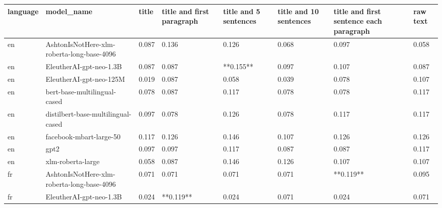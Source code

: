 \begin{tabular}{llllllll}
\toprule
language &                                 model\_name & title & title and first paragraph & title and 5 sentences & title and 10 sentences & title and first sentence each paragraph &  raw text \\
\midrule
      en & AshtonIsNotHere-xlm-roberta-long-base-4096 & 0.087 &                     0.136 &                 0.126 &                  0.068 &                                   0.097 &     0.058 \\
      en &                    EleutherAI-gpt-neo-1.3B & 0.087 &                     0.087 &             **0.155** &                  0.097 &                                   0.107 &     0.087 \\
      en &                    EleutherAI-gpt-neo-125M & 0.019 &                     0.087 &                 0.058 &                  0.039 &                                   0.078 &     0.107 \\
      en &               bert-base-multilingual-cased & 0.078 &                     0.087 &                 0.117 &                  0.078 &                                   0.078 &     0.117 \\
      en &         distilbert-base-multilingual-cased & 0.097 &                     0.078 &                 0.126 &                  0.078 &                                   0.117 &     0.117 \\
      en &                    facebook-mbart-large-50 & 0.117 &                     0.126 &                 0.146 &                  0.107 &                                   0.126 &     0.126 \\
      en &                                       gpt2 & 0.097 &                     0.097 &                 0.117 &                  0.087 &                                   0.087 &     0.117 \\
      en &                          xlm-roberta-large & 0.058 &                     0.087 &                 0.146 &                  0.126 &                                   0.107 &     0.107 \\
      fr & AshtonIsNotHere-xlm-roberta-long-base-4096 & 0.071 &                     0.071 &                 0.071 &                  0.071 &                               **0.119** &     0.095 \\
      fr &                    EleutherAI-gpt-neo-1.3B & 0.024 &                 **0.119** &                 0.024 &                  0.071 &                                   0.024 &     0.071 \\

\end{tabular}
